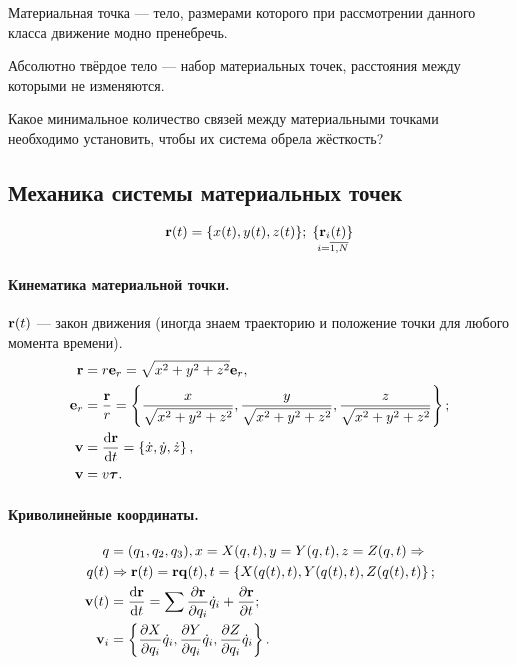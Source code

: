 \documentclass[12pt]{article}
\begin{document}
\begin{dfn}
Материальная точка --- тело, размерами которого при рассмотрении данного класса движение модно пренебречь.
\end{dfn}
\begin{dfn}
Абсолютно твёрдое тело --- набор материальных точек, расстояния между которыми не изменяются.
\end{dfn}

\begin{task} Какое минимальное количество связей между материальными точками необходимо установить, чтобы их система обрела жёсткость? \end{task}

\subsection{Механика системы материальных точек}
\begin{equation*}
\vb{r}(t) = \{x(t), y(t), z(t) \}; \thickspace \mathop{\{\vb{r}_i(t)\}}\limits_{i = \overline{1{,}N}}
\end{equation*}  

\paragraph{Кинематика материальной точки.}
$\vb{r}(t)$ --- закон движения (иногда знаем траекторию и положение точки для любого момента времени). 
\begin{align*}
\vb{r} &= r \vb{e}_r = \sqrt{x^2 + y^2 + z^2} \vb{e}_r, \\
\vb{e}_r &= \frac{\vb{r}}{r} = \left\{ \frac{x}{\sqrt{x^2 + y^2 + z^2}}, \frac{y}{\sqrt{x^2 + y^2 + z^2}}, \frac{z}{\sqrt{x^2 + y^2 + z^2}} \right\};\\
\vb{v} &= \dv{\vb{r}}{t} = \left\{\dot x, \dot y, \dot z\right\},\\
\vb{v} &= v \vb*{\tau}.
\end{align*}

\paragraph{Криволинейные координаты.}
\begin{align*}
q &= (q_1, q_2, q_3), x =X(q, t), y = Y(q, t), z =Z(q, t) \Rightarrow \\
q(t) &\Rightarrow \vb{r}(t) = \vb{r}{\vb{q}(t), t} = \left\{X(q(t), t), Y(q(t), t), Z(q(t), t)\right\}; \\
\vb{v}(t) &= \dv{\vb{r}}{t} = \sum \pdv{\vb{r}}{q_i} \dot q_i + \pdv{\vb{r}}{t}; \\
\vb{v}_i &= \left\{\pdv{X}{q_i} \dot q_i, \pdv{Y}{q_i} \dot q_i, \pdv{Z}{q_i} \dot q_i \right\}.
\end{align*}
\end{document}
